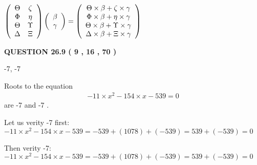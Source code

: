 \documentclass[12pt]{article}
\begin{document}
$  %
 \left( \begin{array}
 {
 c
 c
 }
 \Theta & 
                    \zeta \\ 
 \Phi & 
 \eta \\ 
 \Theta & 
 \Upsilon \\ 
 \Delta & 
                    \Xi
 \end{array} \right)
 \left( \begin{array}
 {
 c
 }
 \beta \\ 
 \gamma
 \end{array} \right)
=
 \left( \begin{array}
 {
 c
 }
  \Theta \times  \beta +                     \zeta \times  \gamma \\ 
  \Phi \times  \beta +  \eta \times  \gamma \\ 
  \Theta \times  \beta +  \Upsilon \times  \gamma \\ 
  \Delta \times  \beta +                     \Xi \times  \gamma
 \end{array} \right)
$
 
 
 
 
 
\noindent{}

 
 
  
\vspace{0.2in}
  
{\textbf{\Large{QUESTION
26.9 
 (           9 ,          16 ,          70 )
}}}
  
  


 
 
\noindent{}

-7,  %
-7
 
 
 
 
 
\noindent{}

Roots to the equation
\begin{eqnarray*}
-11 \times x^2  %
-154
                 \times x    %
-539 =0
\end{eqnarray*}
are  %
-7 and  %
-7 .
 
Let us verity  %
-7 first:
$  %
-11 \times x^2  %
-154
                 \times x    %
-539
  = %
-539+( %
1078)+( %
-539)
  = %
539+( %
-539)
  = %
0
$
 
Then verity  %
-7:
$  %
-11 \times x^2  %
-154
                 \times x    %
-539
  = %
-539+( %
1078)+( %
-539)
  = %
539+( %
-539)
  = %
0
$
 
\end{document}
